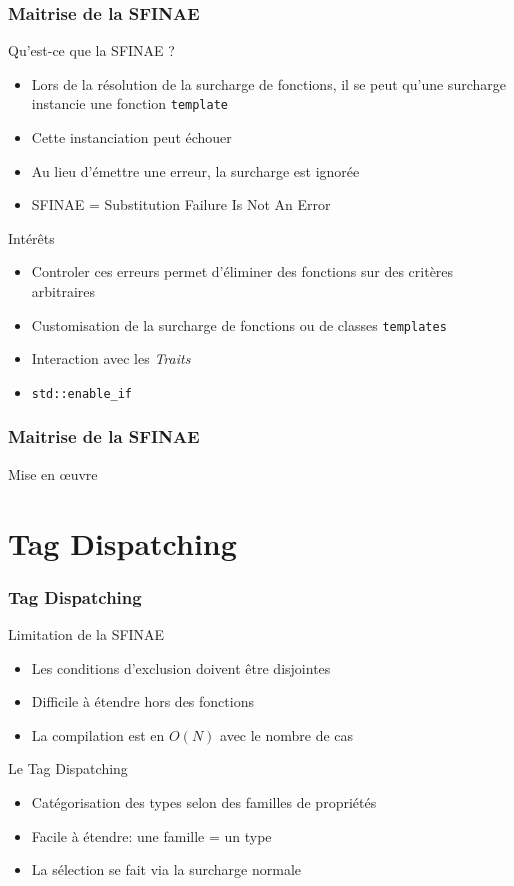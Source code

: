 \documentclass[svgnames]{beamer}
\begin{document}
\frame
{
  \frametitle{Maitrise de la SFINAE}
  \begin{block}{Qu'est-ce que la SFINAE ?}
  \begin{itemize}
  \footnotesize
  \item Lors de la r\'esolution de la surcharge de fonctions, il se peut qu'une 
  surcharge instancie une fonction \texttt{template}
  \item Cette instanciation peut \'echouer
  \item Au lieu d'émettre une erreur, la surcharge est ignor\'ee
  \item SFINAE = Substitution Failure Is Not An Error
  \end{itemize}
  \end{block}


  {
    \begin{block}{Int\'er\^ets}
    \begin{itemize}
    \footnotesize
    \item Controler ces erreurs permet d'\'eliminer des fonctions sur des critères
    arbitraires
    \item Customisation de la surcharge de fonctions ou de classes \texttt{templates}
    \item Interaction avec les \textit{Traits}
    \item \texttt{std::enable\_if}
    \end{itemize}
    \end{block}
  }
}

\frame
{
  \frametitle{Maitrise de la SFINAE}
  \begin{block}{Mise en \oe{uvre}}
  \end{block}
}

\section{Tag Dispatching}
\begin{frame}
\frametitle{Tag Dispatching}
\begin{block}{Limitation de la SFINAE}
\begin{itemize}
\item Les conditions d'exclusion doivent être disjointes
\item Difficile à étendre hors des fonctions
\item La compilation est en $O(N)$ avec le nombre de cas
\end{itemize}
\end{block}

\begin{block}{Le Tag Dispatching}
\begin{itemize}
\item Catégorisation des types selon des familles de propriétés
\item Facile à étendre: une famille = un type
\item La sélection se fait via la surcharge normale
\end{itemize}
\end{block}
\end{frame}
\end{document}
